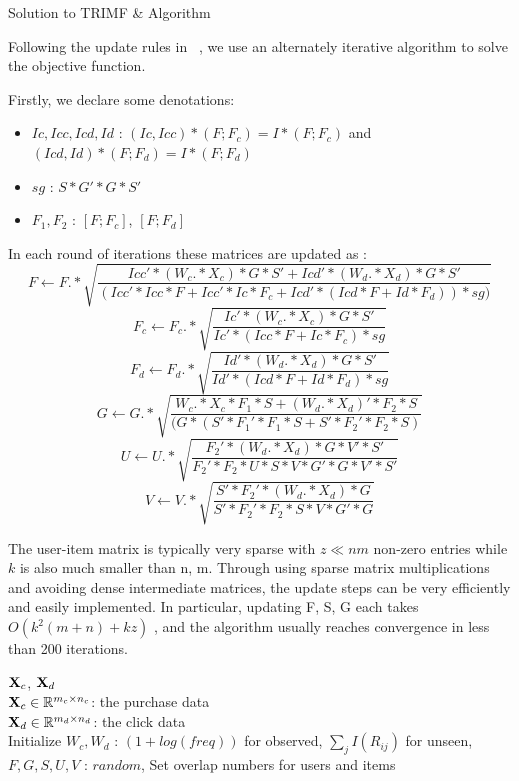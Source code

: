 \begin{section}
  {Solution to TRIMF \& Algorithm}
\par{Following the update rules in ~\cite{Zhuang:2011:EAW:1952191.1952195}, we use an alternately iterative algorithm to solve the objective function.}

Firstly, we declare some denotations:
\begin{itemize}
	\item $Ic,Icc,Icd,Id$ : $(Ic,Icc)*(F;F_c) = I*(F;F_c)$ and $(Icd,Id)*(F;F_d) = I*(F;F_d)$
	\item $sg$ : $S*G'*G*S'$
	\item $F_1, F_2$ : $[F;F_c]$, $[F;F_d]$
\end{itemize}
\par{In each round of iterations these matrices are updated as :
$$F \leftarrow F .* \sqrt{\frac{Icc'*(W_c.*X_c)*G*S' + Icd'*(W_d.*X_d)*G*S'}{(Icc'*Icc*F + Icc'*Ic*F_c + Icd'*(Icd*F + Id*F_d))*sg)}}$$
$$F_c \leftarrow F_c .* \sqrt{\frac{Ic'*(W_c.*X_c)*G*S'}{Ic'*(Icc*F + Ic*F_c)*sg}}$$
$$F_d \leftarrow F_d .* \sqrt{\frac{Id'*(W_d.*X_d)*G*S'}{Id'*(Icd*F + Id*F_d)*sg }}$$
$$G \leftarrow G .* \sqrt{\frac{W_c.*X_c*F_1*S + (W_d.*X_d)'*F_2*S}{(G*(S'*F_1'*F_1*S + S'*F_2'*F_2*S)}}$$
$$U \leftarrow U .* \sqrt{\frac{F_2'*(W_d.*X_d)*G*V'*S'}{F_2'*F_2*U*S*V*G'*G*V'*S'}}$$
$$V \leftarrow V .* \sqrt{\frac{S'*F_2'*(W_d.*X_d)*G}{S'*F_2'*F_2*S*V*G'*G}} $$



}

\par{The user-item matrix is typically very sparse with $z \ll nm$ non-zero entries while $k$ is also much smaller than n, m. Through using sparse matrix multiplications and avoiding dense intermediate matrices, the update steps can be very efficiently and easily implemented. In particular, updating F, S, G each takes $O(k^2 (m + n) + kz)$ , and the algorithm usually reaches convergence in less than 200 iterations.}

\begin{algorithm}[tb]
\caption{Algorithm for TRIMF.}
\begin{algorithmic}

 $\mathbf{X}_{c}$, $\mathbf{X}_{d}$\\
$\mathbf{X}_{c} \in \mathbb{R}^{m_c\times n_c}$: the purchase data \\
$\mathbf{X}_{d} \in \mathbb{R}^{m_d\times n_d}$: the click data\\

 Initialize $W_c, W_d$ : $(1+log(freq))$ for observed, $\sum_jI({R_{ij}})$ for unseen, $F,G,S,U,V$ : $random$, Set overlap numbers for users and items


\end{algorithmic}
\end{algorithm}
\end{section}
